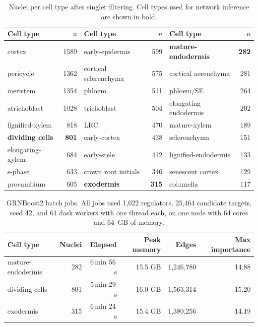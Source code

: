 \documentclass[11pt,a4paper]{article}
\begin{document}
\begin{table}[htbp]
\centering
\begin{singlespace}
\caption{Nuclei per cell type after singlet filtering. Cell types used for network inference are shown in bold.}
\label{tab:celltypes}
\small
\begin{tabular}{lr lr lr}
\toprule
Cell type & $n$ & Cell type & $n$ & Cell type & $n$ \\
\midrule
cortex & 1589 & early-epidermis & 599 & \textbf{mature-endodermis} & \textbf{282} \\
pericycle & 1362 & cortical sclerenchyma & 575 & cortical aerenchyma & 281 \\
meristem & 1354 & phloem & 511 & phloem/SE & 264 \\
atrichoblast & 1028 & trichoblast & 504 & elongating-endodermis & 202 \\
lignified-xylem & 818 & LRC & 470 & mature-xylem & 189 \\
\textbf{dividing cells} & \textbf{801} & early-cortex & 438 & sclerenchyma & 151 \\
elongating-xylem & 684 & early-stele & 412 & lignified-endodermis & 133 \\
s-phase & 633 & crown root initials & 346 & senescent cortex & 129 \\
procambium & 605 & \textbf{exodermis} & \textbf{315} & columella & 117 \\
\bottomrule
\end{tabular}
\end{singlespace}
\end{table}

\begin{table}[htbp]
\centering
\begin{singlespace}
\caption{GRNBoost2 batch jobs. All jobs used 1,022 regulators, 25,464 candidate targets, seed 42, and 64 dask workers with one thread each, on one node with 64 cores and 64~GB of memory.}
\label{tab:runs}
\small
\begin{tabular}{lrrrrr}
\toprule
Cell type & Nuclei & Elapsed & Peak memory & Edges & Max importance \\
\midrule
mature-endodermis & 282 & 6\,min 56\,s & 15.5 GB & 1,246,780 & 14.88 \\
dividing cells    & 801 & 5\,min 29\,s & 16.0 GB & 1,563,314 & 15.20 \\
exodermis         & 315 & 6\,min 24\,s & 15.4 GB & 1,380,256 & 14.19 \\
\bottomrule
\end{tabular}
\end{singlespace}
\end{table}
\end{document}
